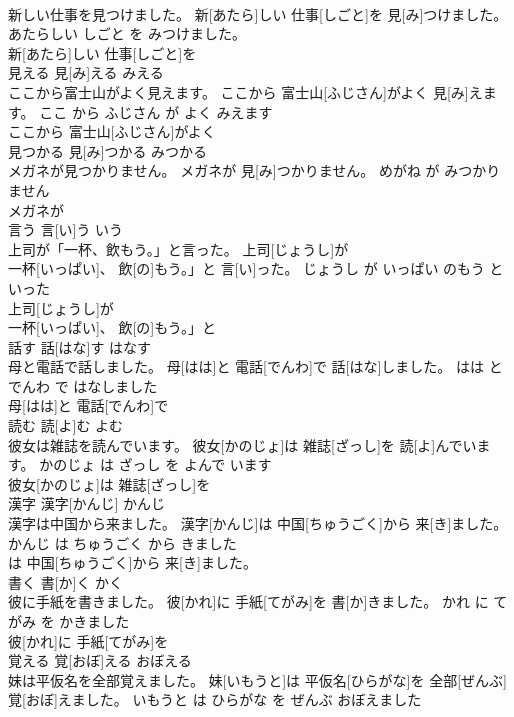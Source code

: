 \documentclass[8pt]{extreport}
\begin{document}
\begin{CJK}{UTF8}{min}
\\	新しい仕事を見つけました。	新[あたら]しい 仕事[しごと]を 見[み]つけました。	あたらしい しごと を みつけました。	
\\	新[あたら]しい 仕事[しごと]を
\\	見える	見[み]える	みえる	
\\	ここから富士山がよく見えます。	ここから 富士山[ふじさん]がよく 見[み]えます。	ここ から ふじさん が よく みえます	
\\	ここから 富士山[ふじさん]がよく
\\	見つかる	見[み]つかる	みつかる	
\\	メガネが見つかりません。	メガネが 見[み]つかりません。	めがね が みつかりません	
\\	メガネが
\\	言う	言[い]う	いう	
\\	上司が「一杯、飲もう。」と言った。	上司[じょうし]が
\\	一杯[いっぱい]、 飲[の]もう。」と 言[い]った。	じょうし が いっぱい のもう と いった	
\\	上司[じょうし]が
\\	一杯[いっぱい]、 飲[の]もう。」と
\\	話す	話[はな]す	はなす	
\\	母と電話で話しました。	母[はは]と 電話[でんわ]で 話[はな]しました。	はは と でんわ で はなしました	
\\	母[はは]と 電話[でんわ]で
\\	読む	読[よ]む	よむ	
\\	彼女は雑誌を読んでいます。	彼女[かのじょ]は 雑誌[ざっし]を 読[よ]んでいます。	かのじょ は ざっし を よんで います	
\\	彼女[かのじょ]は 雑誌[ざっし]を
\\	漢字	漢字[かんじ]	かんじ	
\\	漢字は中国から来ました。	漢字[かんじ]は 中国[ちゅうごく]から 来[き]ました。	かんじ は ちゅうごく から きました	
\\	は 中国[ちゅうごく]から 来[き]ました。			
\\	書く	書[か]く	かく	
\\	彼に手紙を書きました。	彼[かれ]に 手紙[てがみ]を 書[か]きました。	かれ に てがみ を かきました	
\\	彼[かれ]に 手紙[てがみ]を
\\	覚える	覚[おぼ]える	おぼえる	
\\	妹は平仮名を全部覚えました。	妹[いもうと]は 平仮名[ひらがな]を 全部[ぜんぶ] 覚[おぼ]えました。	いもうと は ひらがな を ぜんぶ おぼえました	

\end{CJK}
\end{document}
